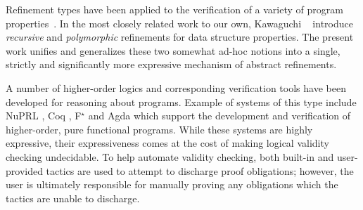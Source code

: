 Refinement types have been applied to the verification of a variety of
program properties~\cite{pfenningxi98,Dunfield,GordonTOPLAS2011,FournetCCS11}.
%
In the most closely related work to our own, Kawaguchi \etal~\cite{LiquidPLDI09} 
introduce \emph{recursive} and \emph{polymorphic} refinements for data
structure properties.
%
The present work unifies and generalizes these two somewhat ad-hoc notions 
into a single, strictly and significantly more expressive mechanism of
abstract refinements.

A number of higher-order logics and corresponding verification tools
have been developed for reasoning about programs.
%
Example of systems of this type include NuPRL \cite{Constable86},
Coq \cite{coq-book}, F$^\star$ \cite{SwamyCFSBY11} and Agda \cite{norell07}
which support the development and verification of higher-order, 
pure functional programs.
%
While these systems are highly expressive, their expressiveness comes at the
cost of making logical validity checking undecidable.
%
To help automate validity checking, both built-in and user-provided
tactics are used to attempt to discharge proof obligations; however,
the user is ultimately responsible for manually proving any
obligations which the tactics are unable to discharge.